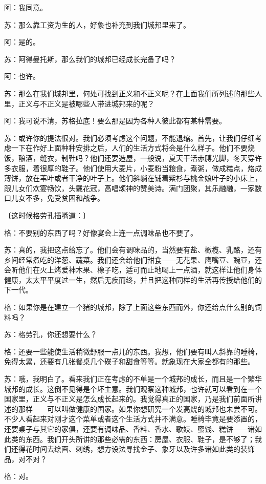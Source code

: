 \documentclass[11pt,oneside]{book}
\begin{document}
\begin{common-format}
阿：我同意。

苏：那么靠工资为生的人，好象也补充到我们城邦里来了。

阿：是的。

苏：阿得曼托斯，那么我们的城邦已经成长完备了吗？

阿：也许。

苏：那么在我们城邦里，何处可找到正义和不正义呢？在上面我们所列述的那些人里，正义与不正义是被哪些人带进城邦来的呢？

阿：我可说不清，苏格拉底！要么那是因为各种人彼此都有某种需要。

苏：或许你的提法很对。我们必须考虑这个问题，不能退缩。首先，让我们仔细考虑一下在作好上面种种安排之后，人们的生活方式将会是什么样子。他们不要烧饭，酿酒，缝衣，制鞋吗？他们还要造屋，一般说，夏天干活赤膊光脚，冬天穿许多衣服，着很厚的鞋子。他们使用大麦片，小麦粉当粮食，煮粥，做成糕点，烙成薄饼，放在苇叶或者干净的叶子上。他们斜躺在铺着紫杉与桃金娘叶子的小床上，跟儿女们欢宴畅饮，头戴花冠，高唱颂神的赞美诗。满门团聚，其乐融融，一家数口儿女不多，免受贫困和战争。

〔这时候格劳孔插嘴道：〕

格：不要别的东西了吗？好像宴会上连一点调味品也不要了。

苏：真的，我把这点给忘了。他们会有调味品的，当然要有盐、橄榄、乳酪，还有乡间经常煮吃的洋葱、蔬菜。我们还会给他们甜食——无花果、鹰嘴豆、豌豆，还会听他们在火上烤爱神木果、橡子吃，适可而止地喝上一点酒，就这样让他们身体健康，太太平平度过一生，然后无疾而终，并且把这种同样的生活再传授给他们的下一代。

格：如果你是在建立一个猪的城邦，除了上面这些东西而外，你还给点什么别的饲料吗？

苏：格劳孔，你还想要什么？

格：还要一些能使生活稍微舒服一点儿的东西。我想，他们要有叫人斜靠的睡椅，免得太累，还要有几张餐桌几个碟子和甜食等等。就象现在大家全都有的那些。

苏：哦，我明白了。看来我们正在考虑的不单是一个城邦的成长，而且是一个繁华城邦的成长。这倒不见得是个坏主意。我们观察这种城邦，也许就可以看到在一个国家里，正义与不正义是怎么成长起来的。我觉得真正的国家，乃是我们前面所讲述的那样——可以叫做健康的国家。如果你想研究一个发高烧的城邦也未尝不可。不少人看起来对刚才这个菜单或者这个生活方式并不满意。睡椅毕竟是要添置的，还要桌子与其它的家俱，还要有调味品、香料、香水、歌妓、蜜饯、糕饼——诸如此类的东西。我们开头所讲的那些必需的东西：房屋、衣服、鞋子，是不够了；我们还得花时间去绘画、刺绣，想方设法寻找金子、象牙以及许多诸如此类的装饰品，对不对？

格：对。


\end{common-format}
\end{document}
